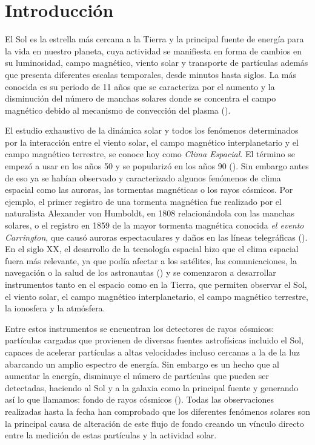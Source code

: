 \newpage
\chapter*{Introducción}
\label{sec:intro}

\noindent El Sol es la estrella más cercana a la Tierra y la principal fuente de energía para la vida en nuestro planeta, cuya actividad se manifiesta en forma de cambios en su luminosidad, campo magnético, viento solar y transporte de partículas además que presenta diferentes escalas temporales, desde minutos hasta siglos. La más conocida es su periodo de 11 años que se caracteriza por el aumento y la disminución del número de manchas solares donde se concentra el campo magnético debido al mecanismo de convección del plasma (\cite{Balogh_2008}).

El estudio exhaustivo de la dinámica solar y todos los fenómenos determinados por la interacción entre el viento solar, el campo magnético interplanetario y el campo magnético terrestre, se conoce hoy como \textit{Clima Espacial}. El término se empezó a usar en los años 50 y se popularizó en los años 90 (\cite{cade_2015}). Sin embargo antes de eso ya se habían observado y caracterizado algunos fenómenos de clima espacial como las auroras, las tormentas magnéticas o los rayos cósmicos. Por ejemplo, el primer registro de una tormenta magnética fue realizado por el naturalista Alexander von Humboldt, en 1808 relacionándola con las manchas solares, o el registro en 1859 de la mayor tormenta magnética conocida \textit{el evento Carrington}, que causó auroras espectaculares y daños en las líneas telegráficas (\cite{hayakawa_2019}). En el siglo XX, el desarrollo de la tecnología espacial hizo que el clima espacial fuera más relevante, ya que podía afectar a los satélites, las comunicaciones, la navegación o la salud de los astronautas (\cite{Schrijver_2015}) y se comenzaron a desarrollar instrumentos tanto en el espacio como en la Tierra, que permiten observar el Sol, el viento solar, el campo magnético interplanetario, el campo magnético terrestre, la ionosfera y la atmósfera. 

Entre estos instrumentos se encuentran los detectores de rayos cósmicos: partículas cargadas que provienen de diversas fuentes astrofísicas incluido el Sol, capaces de acelerar partículas a altas velocidades incluso cercanas a la de la luz abarcando un amplio espectro de energía.  Sin embargo es un hecho que al aumentar la energía, disminuye el número de partículas que pueden ser detectadas, haciendo al Sol y a la galaxia como la principal fuente y generando así lo que llamamos: fondo de rayos cósmicos (\cite{gaisser_2016}). Todas las observaciones realizadas hasta la fecha han comprobado que los diferentes fenómenos solares son la principal causa de alteración de este flujo de fondo creando un vínculo directo entre la medición de estas partículas y la actividad solar. 

